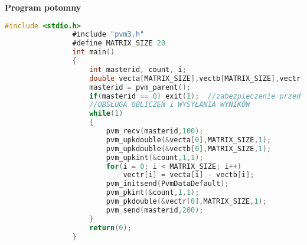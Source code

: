 			\newpage
			\textbf{Program potomny}
			\begin{lstlisting}[language=C]
				#include <stdio.h>
				#include "pvm3.h"
				#define MATRIX_SIZE 20
				int main()
				{
					int masterid, count, i;
					double vecta[MATRIX_SIZE],vectb[MATRIX_SIZE],vectr[MATRIX_SIZE];
					masterid = pvm_parent();
					if(masterid == 0) exit(1);	//zabezpieczenie przed uruchomieniem z poziomu rodzica
					//OBSŁUGA OBLICZEŃ i WYSYŁANIA WYNIKÓW
					while(1)
					{
						pvm_recv(masterid,100);
						pvm_upkdouble(&vecta[0],MATRIX_SIZE,1);
						pvm_upkdouble(&vectb[0],MATRIX_SIZE,1);
						pvm_upkint(&count,1,1);
						for(i = 0; i < MATRIX_SIZE; i++)
							vectr[i] = vecta[i] - vectb[i];
						pvm_initsend(PvmDataDefault);
						pvm_pkint(&count,1,1);
						pvm_pkdouble(&vectr[0],MATRIX_SIZE,1);
						pvm_send(masterid,200);		
					}
					return(0);
				}
			\end{lstlisting}
			